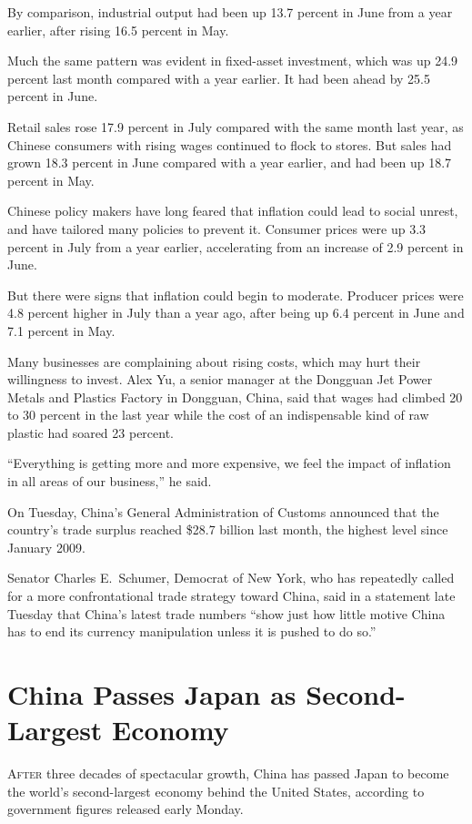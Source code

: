 ﻿\documentclass[12pt]{article}
\begin{document}
By comparison, industrial output had been up 13.7 percent in June from a year earlier, after rising
16.5 percent in May.

Much the same pattern was evident in fixed-asset investment, which was up 24.9 percent last month
compared with a year earlier. It had been ahead by 25.5 percent in June.

Retail sales rose 17.9 percent in July compared with the same month last year, as Chinese consumers
with rising wages continued to flock to stores. But sales had grown 18.3 percent in June compared
with a year earlier, and had been up 18.7 percent in May.

Chinese policy makers have long feared that inflation could lead to social unrest, and have tailored
many policies to prevent it. Consumer prices were up 3.3 percent in July from a year earlier,
accelerating from an increase of 2.9 percent in June.

But there were signs that inflation could begin to moderate. Producer prices were 4.8 percent higher
in July than a year ago, after being up 6.4 percent in June and 7.1 percent in May.

Many businesses are complaining about rising costs, which may hurt their willingness to invest. Alex
Yu, a senior manager at the Dongguan Jet Power Metals and Plastics Factory in Dongguan, China, said
that wages had climbed 20 to 30 percent in the last year while the cost of an indispensable kind of
raw plastic had soared 23 percent.

``Everything is getting more and more expensive, we feel the impact of inflation in all areas of our
business,'' he said.

On Tuesday, China's General Administration of Customs announced that the country's trade surplus
reached \$28.7 billion last month, the highest level since January 2009.

Senator Charles E.~Schumer, Democrat of New York, who has repeatedly called for a more
confrontational trade strategy toward China, said in a statement late Tuesday that China's latest
trade numbers ``show just how little motive China has to end its currency manipulation unless it is
pushed to do so.''

\section{China Passes Japan as Second-Largest Economy}

\lettrine{A}{fter} three decades of spectacular growth, China has passed
Japan to become the world's second-largest economy behind the United States, according to government
figures released early Monday.
\end{document}
